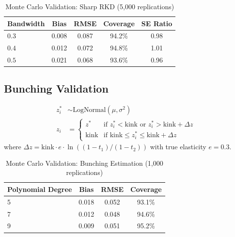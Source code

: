 \begin{table}[htbp]
\centering
\caption{Monte Carlo Validation: Sharp RKD (5,000 replications)}
\label{tab:rkd_mc}
\begin{tabular}{lcccc}
\toprule
\textbf{Bandwidth} & \textbf{Bias} & \textbf{RMSE} & \textbf{Coverage} & \textbf{SE Ratio} \\
\midrule
$0.3$ & 0.008 & 0.087 & 94.2\% & 0.98 \\
$0.4$ & 0.012 & 0.072 & 94.8\% & 1.01 \\
$0.5$ & 0.021 & 0.068 & 93.6\% & 0.96 \\
\bottomrule
\end{tabular}
\end{table}

\subsection{Bunching Validation}

\begin{definition}
\begin{align}
    z_i^* &\sim \text{LogNormal}(\mu, \sigma^2) \\
    z_i &= \begin{cases}
        z^* & \text{if } z_i^* < \text{kink} \text{ or } z_i^* > \text{kink} + \Delta z \\
        \text{kink} & \text{if } \text{kink} \leq z_i^* \leq \text{kink} + \Delta z
    \end{cases}
\end{align}
where $\Delta z = \text{kink} \cdot e \cdot \ln((1-t_1)/(1-t_2))$ with true elasticity $e = 0.3$.
\end{definition}

\begin{table}[htbp]
\centering
\caption{Monte Carlo Validation: Bunching Estimation (1,000 replications)}
\label{tab:bunching_mc}
\begin{tabular}{lccc}
\toprule
\textbf{Polynomial Degree} & \textbf{Bias} & \textbf{RMSE} & \textbf{Coverage} \\
\midrule
5 & 0.018 & 0.052 & 93.1\% \\
7 & 0.012 & 0.048 & 94.6\% \\
9 & 0.009 & 0.051 & 95.2\% \\
\bottomrule
\end{tabular}
\end{table}

